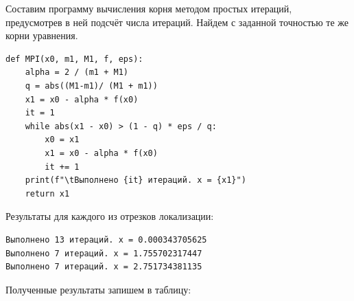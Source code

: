 Составим программу вычисления корня методом простых итераций, предусмотрев в ней подсчёт числа итераций. Найдем с заданной точностью те же корни уравнения.
\begin{verbatim}
def MPI(x0, m1, M1, f, eps):
    alpha = 2 / (m1 + M1)
    q = abs((M1-m1)/ (M1 + m1))
    x1 = x0 - alpha * f(x0)
    it = 1
    while abs(x1 - x0) > (1 - q) * eps / q:
        x0 = x1
        x1 = x0 - alpha * f(x0)
        it += 1
    print(f"\tВыполнено {it} итераций. x = {x1}")
    return x1
\end{verbatim}
Результаты для каждого из отрезков локализации:
\begin{verbatim}
Выполнено 13 итераций. x = 0.000343705625
Выполнено 7 итераций. x = 1.755702317447
Выполнено 7 итераций. x = 2.751734381135
\end{verbatim}

Полученные результаты запишем в таблицу:

